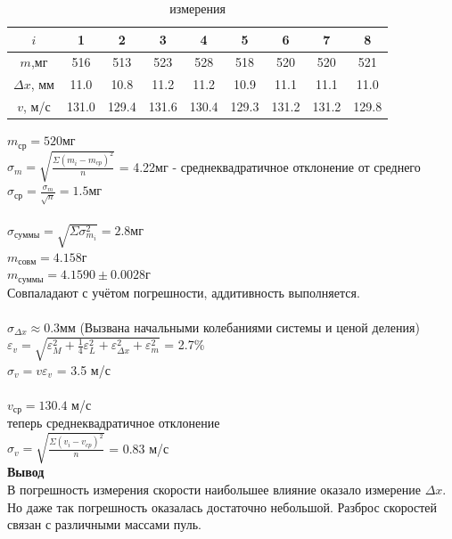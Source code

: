 \documentclass[12pt]{article}
\begin{document}
     \begin{table}[ht]
     	\caption{измерения}
     	\begin{center}
     		\begin{tabular}{|c|c|c|c|c|c|c|c|c|}
     			\hline 
     			$i$ & 1 & 2 & 3 & 4 & 5 & 6 & 7 & 8 \\
     			\hline
     			$m$,мг & 516 & 513 & 523 & 528 & 518 & 520 & 520 & 521 \\
     			\hline
     			$\Delta x$, мм & 11.0 & 10.8 & 11.2 & 11.2 & 10.9 & 11.1 & 11.1 & 11.0 \\
     			\hline
     			$v$, м/с & 131.0 & 129.4 & 131.6 & 130.4 & 129.3 & 131.2 & 131.2 & 129.8 \\
     			\hline
     		\end{tabular}
     	\end{center}
     \end{table}
    
    $m_{ср} = 520 мг$ \\
    $\sigma_m = \sqrt{\frac{\Sigma (m_i - m_{cp})^2 }{n}}$ = 4.22мг 
     - среднеквадратичное отклонение от среднего\\
    $\sigma_{ср}=\frac{\sigma_m}{\sqrt{n}}=1.5мг$ \\ \\
    $\sigma_{суммы} = \sqrt{\Sigma \sigma_{m_i}^2} = 2.8мг$ \\
    $m_{совм} = 4.158 г$ \\
    $m_{суммы} = 4.1590 \pm 0.0028 г$ \\
    Совпаладают с учётом погрешности, аддитивность выполняется. \\ \\
    
    $\sigma_{\Delta x} \approx 0.3 мм$ (Вызвана начальными колебаниями системы и ценой деления) \\
    $\varepsilon_v = \sqrt{\varepsilon_M^2+\frac{1}{4}\varepsilon_L^2+\varepsilon_{\Delta x}^2 +
    	\varepsilon_m^2}$ = 2.7\%  \\
    $\sigma_v = v\varepsilon_v$ = 3.5 м/с \\
    \\
    $v_{ср} = 130.4$ м/с \\
    теперь среднеквадратичное отклонение \\
    $\sigma_v = \sqrt{\frac{\Sigma (v_i - v_{cp})^2 }{n}}$ = 0.83 м/с \\
    
    \textbf{\large Вывод} \\
      В погрешность измерения скорости наибольшее влияние оказало измерение $\Delta x$. Но даже так погрешность оказалась достаточно небольшой. Разброс скоростей связан с различными массами пуль.
    
\end{document}
